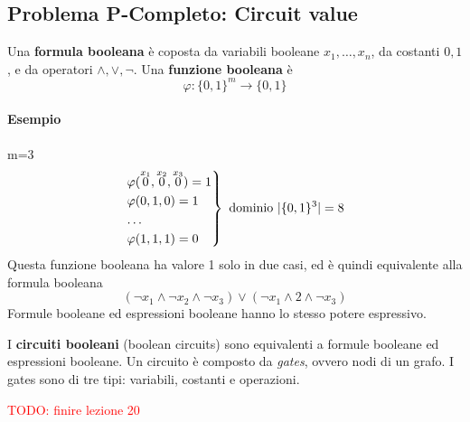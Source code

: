 \subsection{Problema P-Completo: Circuit value}
Una \textbf{formula booleana} è coposta da variabili booleane $x_1,\dots,x_n$, da costanti $0,1$, e da operatori $\land,\lor,\lnot$. Una \textbf{funzione booleana} è 
$$
    \varphi:\{0,1\}^m\to\{0,1\}
$$

\paragraph{Esempio} m=3
$$
    \begin{rcases*}
        \varphi(\overset{x_1}{0},\overset{x_2}{0},\overset{x_3}{0})=1\\
        \varphi(0,1,0)=1\\
        \dots\\
        \varphi(1,1,1)=0
    \end{rcases*} \text{ dominio } |\{0,1\}^3|=8
$$
Questa funzione booleana ha valore 1 solo in due casi, ed è quindi equivalente alla formula booleana
$$
    (\lnot x_1\land \lnot x_2\land \lnot x_3) \lor (\lnot x_1\land 2\land \lnot x_3)
$$
Formule booleane ed espressioni booleane hanno lo stesso potere espressivo.\medskip

I \textbf{circuiti booleani} (boolean circuits) sono equivalenti a formule booleane ed espressioni booleane. Un circuito è composto da \emph{gates}, ovvero nodi di un grafo. I gates sono di tre tipi: variabili, costanti e operazioni.

\begin{center}
\end{center}




\textcolor{Red}{TODO: finire lezione 20}

